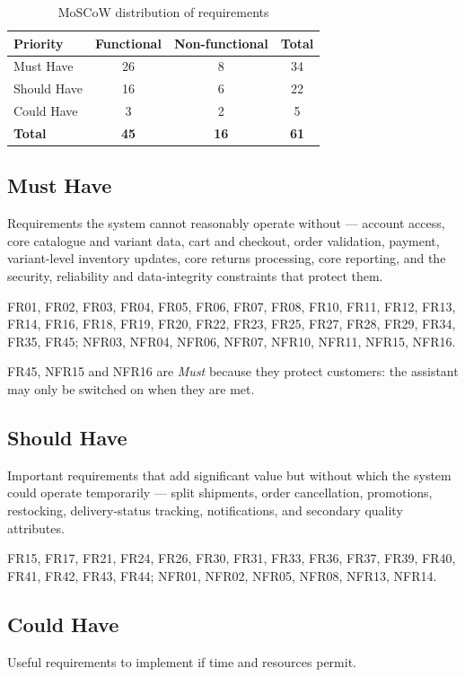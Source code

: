 \documentclass[11pt,a4paper,oneside]{extreport}
\newif\ifshowvtwo
\newcommand{\upd}[1]{\ifshowvtwo\textcolor{red}{#1}\else#1\fi}
\begin{document}
\begin{table}[H]
\centering
\caption{MoSCoW distribution of requirements}
\label{tab:moscowsum}
\begin{tabular}{@{}lccc@{}}
\toprule
\textbf{Priority} & \textbf{Functional} & \textbf{Non-functional} & \textbf{Total} \\ \midrule
Must Have & \upd{26} & \upd{8} & \upd{34} \\
Should Have & \upd{16} & \upd{6} & \upd{22} \\
Could Have & 3 & 2 & 5 \\ \midrule
\textbf{Total} & \textbf{\upd{45}} & \textbf{\upd{16}} & \textbf{\upd{61}} \\ \bottomrule
\end{tabular}
\end{table}

\subsection{Must Have}
Requirements the system cannot reasonably operate without --- account access, core catalogue and variant data, cart and checkout, order validation, payment, variant-level inventory updates, core returns processing, core reporting, and the security, reliability and data-integrity constraints that protect them.

FR01, FR02, FR03, FR04, FR05, FR06, FR07, FR08, FR10, FR11, FR12, FR13, FR14, FR16, FR18, FR19, FR20, FR22, FR23, FR25, FR27, FR28, FR29, FR34, FR35, \upd{FR45}; NFR03, NFR04, NFR06, NFR07, NFR10, NFR11, \upd{NFR15, NFR16}.

\upd{FR45, NFR15 and NFR16 are \emph{Must} because they protect customers: the assistant may only be switched on when they are met.}

\subsection{Should Have}
Important requirements that add significant value but without which the system could operate temporarily --- split shipments, order cancellation, promotions, restocking, delivery-status tracking, notifications, and secondary quality attributes.

FR15, FR17, FR21, FR24, FR26, FR30, FR31, FR33, FR36, FR37, \upd{FR39, FR40, FR41, FR42, FR43, FR44}; NFR01, NFR02, NFR05, NFR08, \upd{NFR13, NFR14}.

\subsection{Could Have}
Useful requirements to implement if time and resources permit.
\end{document}
